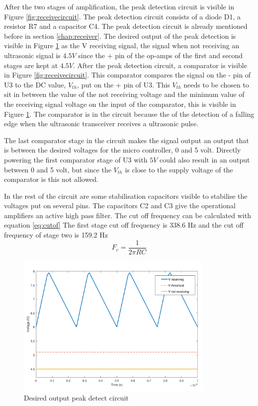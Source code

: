 After the two stages of amplification, the peak detection circuit is visible in Figure \ref{fig:receivecircuit}. The peak detection circuit consists of a diode D1, a resistor R7 and a capacitor C4. The peak detection circuit is already mentioned before in section \ref{chap:receiver}. The desired output of the peak detection is visible in Figure \ref{fig:waves_peak_detect} as the V receiving signal, the signal when not receiving an ultrasonic signal is $4.5V$ since the + pin of the op-amps of the first and second stages are kept at $4.5V$.
After the peak detection circuit, a comparator is visible in Figure \ref{fig:receivecircuit}. This comparator compares the signal on the - pin of U3 to the DC value, $V_{th}$, put on the + pin of U3. This $V_{th}$ needs to be chosen to sit in between the value of the not receiving voltage and the minimum value of the receiving signal voltage on the input of the comparator, this is visible in Figure \ref{fig:waves_peak_detect}. The comparator is in the circuit because the of the detection of a falling edge when the ultrasonic transceiver receives a ultrasonic pulse.

The last comparator stage in the circuit makes the signal output an output that is between the desired voltages for the micro controller, 0 and 5 volt. Directly powering the first comparator stage of U3 with $5V$ could also result in an output between 0 and 5 volt, but since the $V_{th}$ is close to the supply voltage of the comparator is this not allowed.

In the rest of the circuit are some stabilisation capacitors visible to stabilise the voltages put on several pins. The capacitors C2 and C3 give the operational amplifiers an active high pass filter. The cut off frequency can be calculated with equation \ref{eq:cutof}
The first stage cut off frequency is 338.6 Hz and the cut off frequency of stage two is 159.2 Hz
\begin{equation}
\label{eq:cutof}
F_{c}= \frac{1}{2\pi RC}
\end{equation}

\begin{figure}[H]
\centering
\includegraphics[width=0.85\textwidth]{Figures/waves_peak_detect.png}
\caption{Desired output peak detect circuit}
\label{fig:waves_peak_detect}
\end{figure}

